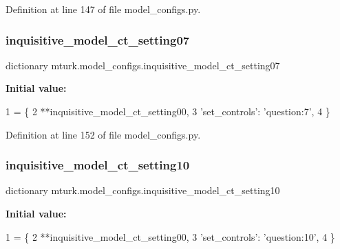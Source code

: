 Definition at line 147 of file model\+\_\+configs.\+py.

\mbox{\label{namespacemturk_1_1model__configs_a9cd0063a3668f14aa326fc65e1124661}} 
\subsubsection{\texorpdfstring{inquisitive\+\_\+model\+\_\+ct\+\_\+setting07}{inquisitive\_model\_ct\_setting07}}
{\footnotesize\ttfamily dictionary mturk.\+model\+\_\+configs.\+inquisitive\+\_\+model\+\_\+ct\+\_\+setting07}

{\bfseries Initial value\+:}
\begin{DoxyCode}
1 =  \{
2     **inquisitive\_model\_ct\_setting00,
3     \textcolor{stringliteral}{'set\_controls'}: \textcolor{stringliteral}{'question:7'},
4 \}
\end{DoxyCode}


Definition at line 152 of file model\+\_\+configs.\+py.

\mbox{\label{namespacemturk_1_1model__configs_a5554ee972af5a98e7a4eac6d80e5896b}} 
\subsubsection{\texorpdfstring{inquisitive\+\_\+model\+\_\+ct\+\_\+setting10}{inquisitive\_model\_ct\_setting10}}
{\footnotesize\ttfamily dictionary mturk.\+model\+\_\+configs.\+inquisitive\+\_\+model\+\_\+ct\+\_\+setting10}

{\bfseries Initial value\+:}
\begin{DoxyCode}
1 =  \{
2     **inquisitive\_model\_ct\_setting00,
3     \textcolor{stringliteral}{'set\_controls'}: \textcolor{stringliteral}{'question:10'},
4 \}
\end{DoxyCode}


